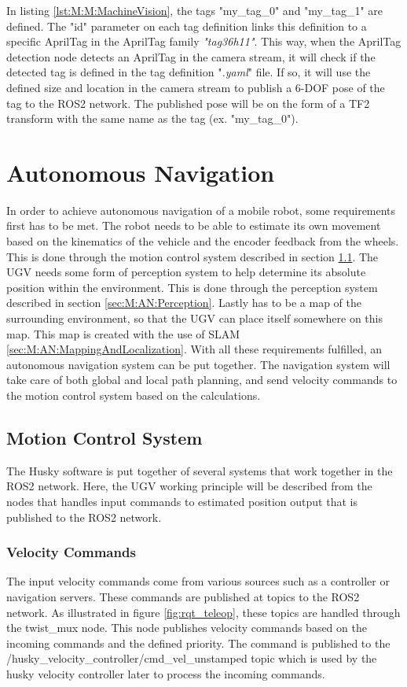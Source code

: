 In listing \ref{lst:M:M:MachineVision}, the tags "my\_tag\_0" and "my\_tag\_1" are defined. The "id" parameter on each tag definition links this definition to a specific AprilTag in the AprilTag family \textit{"tag36h11"}. This way, when the AprilTag detection node detects an AprilTag in the camera stream, it will check if the detected tag is defined in the tag definition "\textit{.yaml}" file. If so, it will use the defined size and location in the camera stream to publish a 6-DOF pose of the tag to the ROS2 network. The published pose will be on the form of a TF2 transform with the same name as the tag (ex. "my\_tag\_0").

\section{Autonomous Navigation}
In order to achieve autonomous navigation of a mobile robot, some requirements first has to be met. The robot needs to be able to estimate its own movement based on the kinematics of the vehicle and the encoder feedback from the wheels. This is done through the motion control system described in section \ref{sec:M:AN:MotionControl}. The UGV needs some form of perception system to help determine its absolute position within the environment. This is done through the perception system described in section \ref{sec:M:AN:Perception}. Lastly has to be a map of the surrounding environment, so that the UGV can place itself somewhere on this map. This map is created with the use of SLAM \ref{sec:M:AN:MappingAndLocalization}. With all these requirements fulfilled, an autonomous navigation system can be put together. The navigation system will take care of both global and local path planning, and send velocity commands to the motion control system based on the calculations.

\subsection{Motion Control System}\label{sec:M:AN:MotionControl}
The Husky software is put together of several systems that work together in the ROS2 network. Here, the UGV working principle will be described from the nodes that handles input commands to estimated position output that is published to the ROS2 network.

\subsubsection{Velocity Commands}
The input velocity commands come from various sources such as a controller or navigation servers. These commands are published at topics to the ROS2 network. As illustrated in figure \ref{fig:rqt_teleop}, these topics are handled through the twist\_mux node. This node publishes velocity commands based on the incoming commands and the defined priority. The command is published to the \\/husky\_velocity\_controller/cmd\_vel\_unstamped topic which is used by the husky velocity controller later to process the incoming commands.

